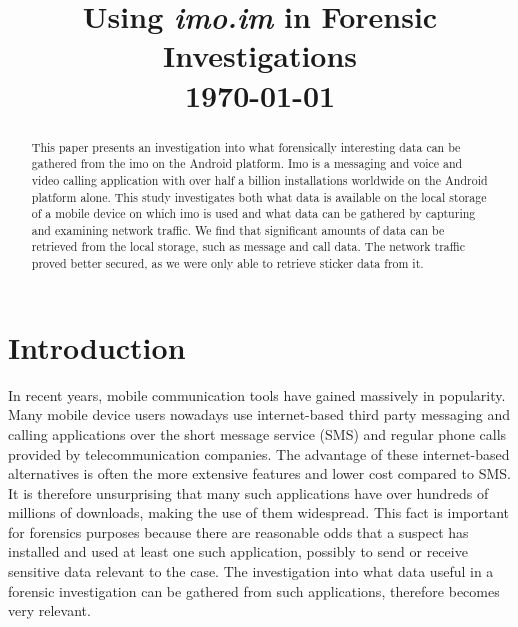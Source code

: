 \documentclass[conference]{IEEEtran}
\begin{document}
\title{Using {\it imo.im} in Forensic Investigations \\\vspace{5mm} \large  \today}
\author{
\and
{}
}
\maketitle
\thispagestyle{plain}
\pagestyle{plain}

\begin{abstract}

    This paper presents an investigation into what forensically interesting data
    can be gathered from the imo on the Android platform. Imo is a messaging and
    voice and video calling application with over half a billion installations
    worldwide on the Android platform alone. This study investigates both what
    data is available on the local storage of a mobile device on which imo is
    used and what data can be gathered by capturing and examining network
    traffic. We find that significant amounts of data can be retrieved from the
    local storage, such as message and call data. The network traffic proved
    better secured, as we were only able to retrieve sticker data from it.

\end{abstract}

\section{Introduction}

In recent years, mobile communication tools have gained massively in
popularity. Many mobile device users nowadays use internet-based third party
messaging and calling applications over the short message service (SMS) and
regular phone calls provided by telecommunication companies.  The advantage of
these internet-based alternatives is often the more extensive features and
lower cost compared to SMS. It is therefore unsurprising that many such
applications have over hundreds of millions of downloads, making the use of
them widespread. This fact is important for forensics purposes because there
are reasonable odds that a suspect has installed and used at least one such
application, possibly to send or receive sensitive data relevant to the case.
The investigation into what data useful in a forensic investigation can be
gathered from such applications, therefore becomes very relevant.
\end{document}
